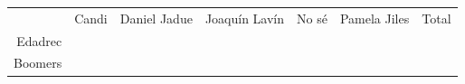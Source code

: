 \documentclass[
]{article}
\begin{document}
\begin{longtable}[]{@{}rrrrrrr@{}}
\toprule
\endhead
\begin{minipage}[t]{0.11\columnwidth}\raggedleft
\strut
\end{minipage} & \begin{minipage}[t]{0.06\columnwidth}\raggedleft
Candi\strut
\end{minipage} & \begin{minipage}[t]{0.13\columnwidth}\raggedleft
Daniel Jadue\strut
\end{minipage} & \begin{minipage}[t]{0.12\columnwidth}\raggedleft
Joaquín Lavín\strut
\end{minipage} & \begin{minipage}[t]{0.13\columnwidth}\raggedleft
No sé\strut
\end{minipage} & \begin{minipage}[t]{0.13\columnwidth}\raggedleft
Pamela Jiles\strut
\end{minipage} & \begin{minipage}[t]{0.13\columnwidth}\raggedleft
Total\strut
\end{minipage}\tabularnewline
\begin{minipage}[t]{0.11\columnwidth}\raggedleft
Edadrec\strut
\end{minipage} & \begin{minipage}[t]{0.06\columnwidth}\raggedleft
\strut
\end{minipage} & \begin{minipage}[t]{0.13\columnwidth}\raggedleft
\strut
\end{minipage} & \begin{minipage}[t]{0.12\columnwidth}\raggedleft
\strut
\end{minipage} & \begin{minipage}[t]{0.13\columnwidth}\raggedleft
\strut
\end{minipage} & \begin{minipage}[t]{0.13\columnwidth}\raggedleft
\strut
\end{minipage} & \begin{minipage}[t]{0.13\columnwidth}\raggedleft
\strut
\end{minipage}\tabularnewline
\begin{minipage}[t]{0.11\columnwidth}\raggedleft
Boomers\strut
\end{minipage} & \begin{minipage}[t]{0.06\columnwidth}\raggedleft
\strut
\end{minipage} & \begin{minipage}[t]{0.13\columnwidth}\raggedleft

\end{minipage}
\end{longtable}
\end{document}
